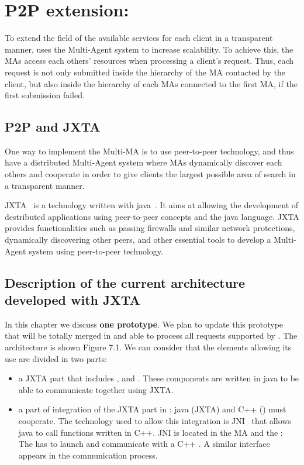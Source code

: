 \chapter{P2P \diet extension: \dietj}
\label{ch:p2pextension}

To extend the field of the available services for each client in a
transparent manner, \diet uses the Multi-Agent system to increase
scalability. To achieve this, the MAs access each others' resources
when processing a client's request. Thus, each request is not only
submitted inside the hierarchy of the MA contacted by the client, but
also inside the hierarchy of each MAs connected to the first MA, if the
first submission failed.

\section{P2P and JXTA}
\label{sec:JXTA}

One way to implement the Multi-MA is to use peer-to-peer technology,
and thus have a distributed Multi-Agent system where MAs dynamically
discover each others and cooperate in order to give clients the largest
possible area of search in a transparent manner.

JXTA~\cite{JXTA} is a technology written with java~\cite{java}. It
aims at allowing the development of destributed applications using
peer-to-peer concepts and the java language. JXTA provides
functionalities such as passing firewalls and similar network
protections, dynamically discovering other peers, and other essential
tools to develop a Multi-Agent system using peer-to-peer technology.

\section{Description of the current architecture developed with JXTA}
\label{sec:archi}

In this chapter we discuss \textbf{one prototype}. We plan to update this
prototype that will be totally merged in \diet and able to process all requests
supported by \diet. The \dietj architecture is shown Figure 7.1.  We can
consider that the elements allowing its use are divided in two parts:

\begin{itemize}
\item{a JXTA part that includes \clientj, \MAj and \sedj. These components are
  written in java to be able to communicate together using JXTA.}
  
\item{a part of integration of the JXTA part in \diet: java (JXTA) and C++
  (\diet) must cooperate. The technology used to allow this integration is
  JNI~\cite{JNI} that allows java to call functions written in C++. JNI is
  located in the MA and the \sed: The \MAj has to launch and communicate with a
  C++ \MAdiet. A similar interface appears in the \sed communication process.}
\end{itemize}

